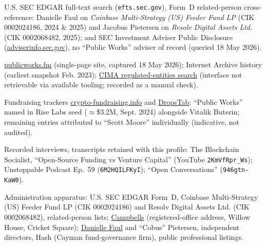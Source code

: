 \documentclass[11pt,letterpaper]{article}
\begin{document}
\begin{enumerate}[leftmargin=1.6em, itemsep=0.12em, label={[\arabic*]}]
\item U.S. SEC EDGAR full-text search (\texttt{efts.sec.gov}), Form~D related-person cross-reference: Danielle Faul on \textit{Coinbase Multi-Strategy (US) Feeder Fund LP} (CIK 0002024186, 2024 \& 2025) and Jacobus Pietersen on \textit{Resolv Digital Assets Ltd.} (CIK 0002068482, 2025); and SEC Investment Adviser Public Disclosure (\href{https://adviserinfo.sec.gov/}{adviserinfo.sec.gov}), no ``Public Works'' adviser of record (queried 18 May 2026).
\item \href{https://www.publicworks.fm/}{publicworks.fm} (single-page site, captured 18 May 2026); Internet Archive history (earliest snapshot Feb. 2023); \href{https://www.cima.ky/search-entities-cima}{CIMA regulated-entities search} (interface not retrievable via available tooling; recorded as a manual check).
\item Fundraising trackers \href{https://crypto-fundraising.info/funds/scott-moore/}{crypto-fundraising.info} and \href{https://dropstab.com/investors/scott-moore/portfolio}{DropsTab}: ``Public Works'' named in Rise Labs seed ($\approx$\$3.2M, Sept. 2024) alongside Vitalik Buterin; remaining entries attributed to ``Scott Moore'' individually (indicative, not audited).
\item Recorded interviews, transcripts retained with this profile: The Blockchain Socialist, ``Open-Source Funding vs Venture Capital'' (YouTube \texttt{2KmVfRpr\_Ws}); Unstoppable Podcast Ep.~59 (\texttt{6M2HQILFKyI}); ``Open Conversations'' (\texttt{946gtn-KaW0}).
\item Administration apparatus: U.S. SEC EDGAR Form~D, Coinbase Multi-Strategy (US) Feeder Fund LP (CIK 0002024186) and Resolv Digital Assets Ltd. (CIK 0002068482), related-person lists; \href{https://www.campbellslegal.com/contact/cayman-islands/}{Campbells} (registered-office address, Willow House, Cricket Square); \href{https://www.linkedin.com/in/danielle-faul/}{Danielle Faul} and ``Cobus'' Pietersen, independent directors, Hash (Cayman fund-governance firm), public professional listings.
\end{enumerate}
\end{document}
